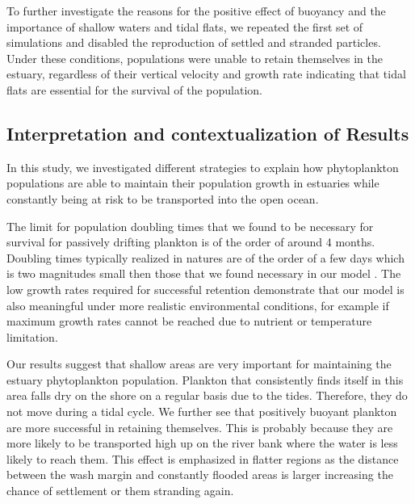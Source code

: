 \documentclass[npg, manuscript]{copernicus}
\begin{document}
To further investigate the reasons for the positive effect of buoyancy and the importance of shallow waters and tidal flats, we repeated the first set of simulations and disabled the reproduction of settled and stranded particles.
Under these conditions, populations were unable to retain themselves in the estuary, regardless of their vertical velocity and growth rate indicating that tidal flats are essential for the survival of the population.




\subsection{Interpretation and contextualization of Results}

In this study, we investigated different strategies to explain how phytoplankton populations are able to maintain their population growth in estuaries while constantly being at risk to be transported into the open ocean.

The limit for population doubling times that we found to be necessary for survival for passively drifting plankton is of the order of around 4 months. Doubling times typically realized in natures are of the order of a few days which is two magnitudes small then those that we found necessary in our model \citep{Koch2004,Wirtz2011}.
The low growth rates required for successful retention demonstrate that our model is also meaningful under more realistic environmental conditions, for example if maximum growth rates cannot be reached due to nutrient or temperature limitation.

Our results suggest that shallow areas are very important for maintaining the estuary phytoplankton population.
Plankton that consistently finds itself in this area falls dry on the shore on a regular basis due to the tides.
Therefore, they do not move during a tidal cycle.
We further see that positively buoyant plankton are more successful in retaining themselves. 
This is probably because they are more likely to be transported high up on the river bank where the water is less likely to reach them.
This effect is emphasized in flatter regions as the distance between the wash margin and constantly flooded areas is larger increasing the chance of settlement or them stranding again.
\end{document}

